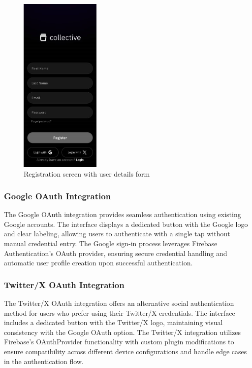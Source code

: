 \nopagebreak
\begin{figure}[H]
\centering
\includegraphics[width=0.35\textwidth]{files/imgs/prototype/auth_register.jpeg}
\caption{Registration screen with user details form}
\label{fig:registration-screen}
\end{figure}

\subsubsection{Google OAuth Integration}

The Google OAuth integration provides seamless authentication using existing Google accounts. The interface displays a dedicated button with the Google logo and clear labeling, allowing users to authenticate with a single tap without manual credential entry. The Google sign-in process leverages Firebase Authentication's OAuth provider, ensuring secure credential handling and automatic user profile creation upon successful authentication.

\subsubsection{Twitter/X OAuth Integration}

The Twitter/X OAuth integration offers an alternative social authentication method for users who prefer using their Twitter/X credentials. The interface includes a dedicated button with the Twitter/X logo, maintaining visual consistency with the Google OAuth option. The Twitter/X integration utilizes Firebase's OAuthProvider functionality with custom plugin modifications to ensure compatibility across different device configurations and handle edge cases in the authentication flow.

